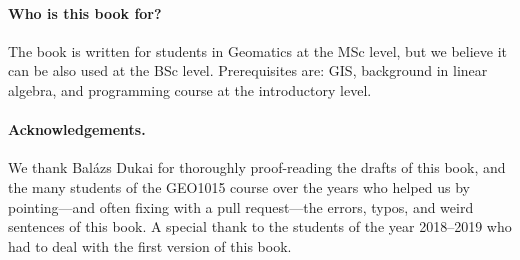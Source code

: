\paragraph*{Who is this book for?}
The book is written for students in Geomatics at the MSc level, but we believe it can be also used at the BSc level.
Prerequisites are: GIS, background in linear algebra, and programming course at the introductory level.


\paragraph*{Acknowledgements.}
We thank Balázs Dukai for thoroughly proof-reading the drafts of this book, and the many students of the GEO1015 course over the years who helped us by pointing---and often fixing with a pull request---the errors, typos, and weird sentences of this book. 
A special thank to the students of the year 2018--2019 who had to deal with the first version of this book.






